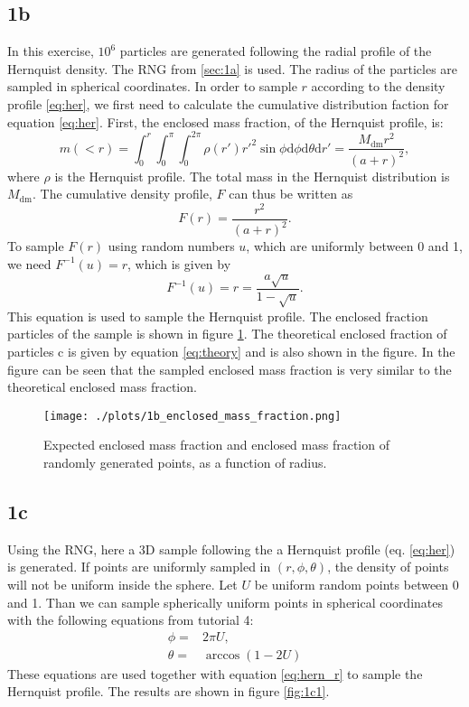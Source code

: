 \subsection*{1b}
In this exercise, $10^6$ particles are generated following the radial profile of the Hernquist density. The RNG from \ref{sec:1a} is used. The radius of the particles are sampled in spherical coordinates. In order to sample $r$ according to the density profile \ref{eq:her}, we first need to calculate the cumulative distribution faction for equation \ref{eq:her}. First, the enclosed mass fraction, of the Hernquist profile, is:
\begin{equation}
  m(<r) = \int_0^r \int_0^\pi \int_0^{2\pi} \rho(r') r'^2 \sin\phi \mathrm{d}\phi\mathrm{d}\theta\mathrm{d}r'=\frac{M_\mathrm{dm}r^2}{\left(a+r\right)^2},
\end{equation}
where $\rho$ is the Hernquist profile. The total mass in the Hernquist distribution is $M_\mathrm{dm}$. The cumulative density profile, $F$ can thus be written as
\begin{equation}\label{eq:theory}
  F(r) = \frac{r^2}{\left(a+r\right)^2}.
\end{equation}
To sample $F(r)$ using random numbers $u$, which are uniformly between 0 and 1, we need $F^{-1}(u) = r$, which is given by
\begin{equation}\label{eq:hern_r}
  F^{-1}(u) = r = \frac{a\sqrt{u}}{1-\sqrt{u}}.
\end{equation}
This equation is used to sample the Hernquist profile. The enclosed fraction particles of the sample is shown in figure \ref{fig:1b}. The theoretical enclosed fraction of particles c is given by equation \ref{eq:theory} and is also shown in the figure. In the figure can be seen that the sampled enclosed mass fraction is very similar to the theoretical enclosed mass fraction.

\begin{figure}[!ht]
  \centering
  \texttt{[image: ./plots/1b\_enclosed\_mass\_fraction.png]}
  \caption{Expected enclosed mass fraction and enclosed mass fraction of randomly generated points, as a function of radius.}
  \label{fig:1b}
\end{figure}

\subsection*{1c}
Using the RNG, here a 3D sample following the a Hernquist profile (eq. \ref{eq:her}) is generated. If points are uniformly sampled in $(r,\phi, \theta)$, the density of points will not be uniform inside the sphere. Let $U$ be uniform random points between 0 and 1. Than we can sample spherically uniform points in spherical coordinates with the following equations from tutorial 4:
\begin{eqnarray}
  \phi =& 2\pi U, \\
  \theta =& \arccos(1-2U)
\end{eqnarray}
These equations are used together with equation \ref{eq:hern_r} to sample the Hernquist profile. The results are shown in figure \ref{fig:1c1}.

